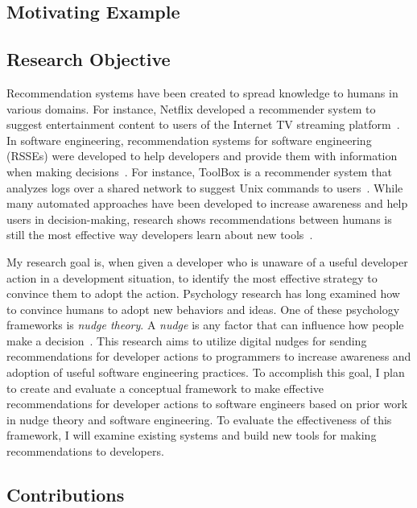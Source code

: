 \subsection{Motivating Example}


\subsection{Research Objective}

Recommendation systems have been created to spread knowledge to humans in various domains. For instance, Netflix developed a recommender system to suggest entertainment content to users of the Internet TV streaming platform~\cite{Netflix}. In software engineering, recommendation systems for software engineering (RSSEs) were developed to help developers and provide them with information when making decisions~\cite{RSSE}. For instance, ToolBox is a recommender system that analyzes logs over a shared network to suggest Unix commands to users~\cite{ToolBox}. While many automated approaches have been developed to increase awareness and help users in decision-making, research shows recommendations between humans is still the most effective way developers learn about new tools~\cite{Murphy-Hill2011PeerInteraction}.

My research goal is, when given a developer who is unaware of a useful developer action in a development situation, to identify the most effective strategy to convince them to adopt the action. Psychology research has long examined how to convince humans to adopt new behaviors and ideas. One of these psychology frameworks is \textit{nudge theory}. A \textit{nudge} is any factor that can influence how people make a decision~\cite{sunstein2008nudge}. This research aims to utilize digital nudges for sending recommendations for developer actions to programmers to increase awareness and adoption of useful software engineering practices. To accomplish this goal, I plan to create and evaluate a conceptual framework to make effective recommendations for developer actions to software engineers based on prior work in nudge theory and software engineering. To evaluate the effectiveness of this framework, I will examine existing systems and build new tools for making recommendations to developers.

\subsection{Contributions}

